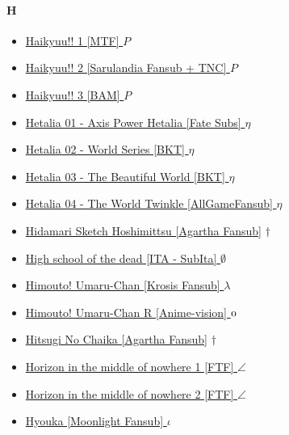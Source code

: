 		\paragraph{H} \hypertarget{SH}{}
			\begin{itemize}
				
				\item \href{https://mega.nz/#F!QSxn3JgS!Dj39lya9BFjmtqVNxIeDKw} {Haikyuu!! 1 [MTF] }  $P$ \\ 
				\item \href{https://mega.nz/#F!AbwSXLaJ!29HQ09_y9lnV61nagB_13Q} {Haikyuu!! 2 [Sarulandia Fansub + TNC] }  $P$ \\ 
				\item \href{https://mega.nz/#F!pPZR3Crb!76OdnYTF4374PM_rKBsiWQ} {Haikyuu!! 3 [BAM] }  $P$ \\ 
				\item \href{https://mega.nz/#F!BEVxUCJY!kHisXr0VyjfOWaw9NeqTkw} {Hetalia 01 - Axis Power Hetalia [Fate Subs] }  $\eta$ \\ 
				\item \href{https://mega.nz/#F!wVUxlQLC!nuSzgDjgaeaBFoQaFtI-gA} {Hetalia 02 - World Series [BKT] }  $\eta$ \\ 
				\item \href{https://mega.nz/#F!EV8jTJIL!9ZGYe1V-cj3k8Pd-_Ip2wg} {Hetalia 03 - The Beautiful World [BKT] }  $\eta$ \\ 
				\item \href{https://mega.nz/#F!RBkhUbKB!AjdS2z9nrgvjV-pCSkFXzw} {Hetalia 04 - The World Twinkle [AllGameFansub] }  $\eta$ \\ 
				\item \href{https://mega.nz/#F!fCR3XCSA!CY5pP3hGTtDKiQ_8m7XU2A} {Hidamari Sketch Hoshimittsu [Agartha Fansub]}   $\dag$  \\ 
				\item \href{https://mega.nz/#F!cXxGgLjA!WbUSta59BwQlt_mfnbyCeQ} {High school of the dead [ITA - SubIta] }  $\emptyset$ \\
				\item \href{https://mega.nz/#F!L8AVVIIY!z_v5TPZE0CV7Pf7wvvsG-A} {Himouto! Umaru-Chan [Krosis Fansub] }  $\lambda$ \\ 
				\item \href{https://mega.nz/#F!PvYSRT7B!tL3VTe4ym31LYMy8w1eJtQ} {Himouto! Umaru-Chan R [Anime-vision] }  $\oldstylenums{0}$ \\ 
				\item \href{https://mega.nz/#F!KTIx0QwQ!5eVXgvp2br_N97pWFiFgQA} {Hitsugi No Chaika [Agartha Fansub]}  $\dag$ \\ 
				\item \href{https://mega.nz/#F!gyYhVA5A!0R5MamlQPJzt1Stlo2k2hQ} {Horizon in the middle of nowhere 1 [FTF] }  $\angle$ \\ 
				\item \href{https://mega.nz/#F!R6hlGZSQ!q9j380kFIUwMRU2IOxv-BQ} {Horizon in the middle of nowhere 2 [FTF] }  $\angle$ \\ 
				\item \href{https://mega.nz/#F!FwgVUDLR!fx5xan8kgatkRYgWD-3qNQ} {Hyouka [Moonlight Fansub] }  $\iota$ \\ 
				

\end{itemize}
